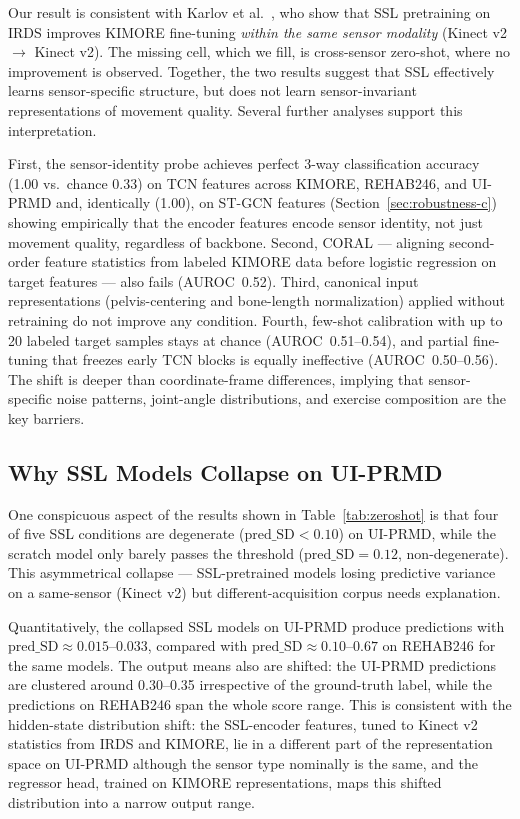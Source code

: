 \documentclass[10pt,journal]{IEEEtran}
\begin{document}
Our result is consistent with Karlov et al.\ \cite{karlov2024}, who show that SSL pretraining on IRDS improves KIMORE fine-tuning \emph{within the same sensor modality} (Kinect v2 $\to$ Kinect v2). The missing cell, which we fill, is cross-sensor zero-shot, where no improvement is observed. Together, the two results suggest that SSL effectively learns sensor-specific structure, but does not learn sensor-invariant representations of movement quality. Several further analyses support this interpretation.

First, the sensor-identity probe achieves perfect 3-way classification accuracy (1.00 vs.\ chance 0.33) on TCN features across KIMORE, REHAB246, and UI-PRMD and, identically (1.00), on ST-GCN features (Section~\ref{sec:robustness-c}) showing empirically that the encoder features encode sensor identity, not just movement quality, regardless of backbone. Second, CORAL \cite{sun2016deep} --- aligning second-order feature statistics from labeled KIMORE data before logistic regression on target features --- also fails (AUROC~0.52). Third, canonical input representations (pelvis-centering and bone-length normalization) applied without retraining do not improve any condition. Fourth, few-shot calibration with up to 20 labeled target samples stays at chance (AUROC~0.51--0.54), and partial fine-tuning that freezes early TCN blocks is equally ineffective (AUROC~0.50--0.56). The shift is deeper than coordinate-frame differences, implying that sensor-specific noise patterns, joint-angle distributions, and exercise composition are the key barriers.

\subsection{Why SSL Models Collapse on UI-PRMD}
\label{sec:collapse}

One conspicuous aspect of the results shown in Table~\ref{tab:zeroshot} is that four of five SSL conditions are degenerate ($\text{pred\_SD} < 0.10$) on UI-PRMD, while the scratch model only barely passes the threshold ($\text{pred\_SD}=0.12$, non-degenerate). This asymmetrical collapse --- SSL-pretrained models losing predictive variance on a same-sensor (Kinect v2) but different-acquisition corpus needs explanation.

Quantitatively, the collapsed SSL models on UI-PRMD produce predictions with $\text{pred\_SD} \approx 0.015$--$0.033$, compared with $\text{pred\_SD} \approx 0.10$--$0.67$ on REHAB246 for the same models. The output means also are shifted: the UI-PRMD predictions are clustered around 0.30--0.35 irrespective of the ground-truth label, while the predictions on REHAB246 span the whole score range. This is consistent with the hidden-state distribution shift: the SSL-encoder features, tuned to Kinect v2 statistics from IRDS and KIMORE, lie in a different part of the representation space on UI-PRMD although the sensor type nominally is the same, and the regressor head, trained on KIMORE representations, maps this shifted distribution into a narrow output range.
\end{document}
